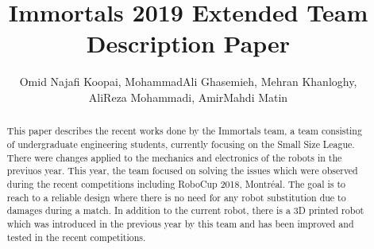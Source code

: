 \documentclass[runningheads,a4paper]{llncs}
\title{Immortals 2019 Extended Team Description Paper}
\author{\normalsize Omid Najafi Koopai{\textsupsub{\small\texttt{1}}{}}, 
MohammadAli Ghasemieh{\textsupsub{\small\texttt{2}}{}}, 
Mehran Khanloghy{\textsupsub{\small\texttt{3}}{}}, \\
\normalsize AliReza Mohammadi{\textsupsub{\small\texttt{3}}{}}, 
AmirMahdi Matin{\textsupsub{\small\texttt{3}}{}}
}
\institute{Sharif University of Technology, \\
\texttt{http://devoted-web-site.url}}
\begin{document}
\maketitle


%
%

\begin{abstract}
This paper describes the recent works done by the Immortals team, a team consisting of undergraduate engineering students, currently focusing on the Small Size League. There were changes applied to the mechanics and electronics of the robots in the previuos year. This year, the team focused on solving the issues which were observed during the recent competitions including RoboCup 2018, Montréal. The goal is to reach to a reliable design where there is no need for any robot substitution due to damages during a match. In addition to the current robot, there is a 3D printed robot which was introduced in the previous year by this team and has been improved and tested in the recent competitions.

\end{abstract}


\justify
\end{document}
